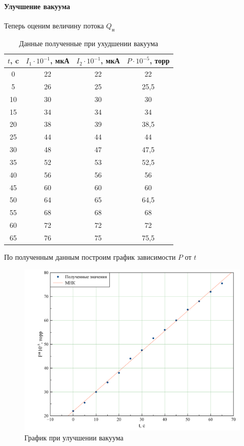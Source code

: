 \documentclass{letnab}
\begin{document}
\paragraph{Улучшение вакуума}
Теперь оценим величину потока $Q_\text{н}$
\begin{table}[H]
	\centering
	\caption{Данные полученные при ухудшении вакуума}
	\begin{tabular}{ccc|c}
		\toprule
		$t$, c & $I_1\cdot10^{-1}$, мкА & $I_2\cdot10^{-1}$, мкА & $P\cdot10^{-5}$, торр  \\ \midrule 
		0    & 22    & 22 & 22                      \\
		5    & 26    & 25 & 25,5                        \\
		10   & 30    & 30 & 30                         \\
		15   & 34    & 34 & 34                       \\
		20   & 38    & 39 & 38,5                     \\
		25   & 44    & 44 & 44                       \\
		30   & 48    & 47 & 47,5                  \\
		35   & 52    & 53 & 52,5                   \\
		40   & 56    & 56 & 56                     \\
		45   & 60    & 60 & 60                      \\
		50   & 64    & 65 & 64,5                    \\
		55   & 68    & 68 & 68                       \\
		60   & 72    & 72 & 72                     \\
		65   & 76    & 75 & 75,5                 \\ \bottomrule 
	\end{tabular}
\end{table}
По полученным данным построим график зависимости $P$ от $t$
\begin{figure}[H]
	\includegraphics[width=150mm]{Graph2.png}
	\caption{График при улучшении вакуума}
\end{figure}
\end{document}
